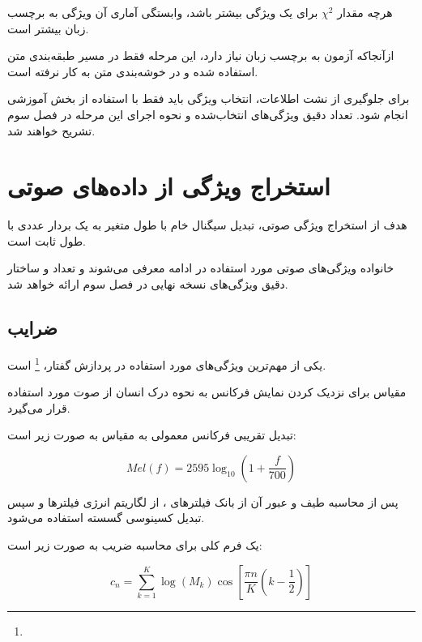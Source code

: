 هرچه مقدار
$\chi^2$
برای یک ویژگی بیشتر باشد، وابستگی آماری آن ویژگی به برچسب زبان بیشتر است.

ازآنجاکه آزمون
به برچسب زبان نیاز دارد، این مرحله فقط در مسیر طبقه‌بندی متن استفاده شده و در خوشه‌بندی متن به کار نرفته است.

برای جلوگیری از نشت اطلاعات، انتخاب ویژگی باید فقط با استفاده از بخش آموزشی انجام شود. تعداد دقیق ویژگی‌های انتخاب‌شده و نحوه اجرای این مرحله در فصل سوم تشریح خواهند شد.

\section{استخراج ویژگی از داده‌های صوتی}

هدف از استخراج ویژگی صوتی، تبدیل سیگنال خام با طول متغیر به یک بردار عددی با طول ثابت است.

خانواده ویژگی‌های صوتی مورد استفاده در ادامه معرفی می‌شوند و تعداد و ساختار دقیق ویژگی‌های نسخه نهایی در فصل سوم ارائه خواهد شد.


\subsection{ضرایب }

یکی از مهم‌ترین ویژگی‌های مورد استفاده در پردازش گفتار،
\footnote{}
است.

مقیاس
برای نزدیک کردن نمایش فرکانس به نحوه درک انسان از صوت مورد استفاده قرار می‌گیرد.

تبدیل تقریبی فرکانس معمولی به مقیاس
به صورت زیر است:

\begin{equation}
Mel(f)
=
2595
\log_{10}
\left(
1+\frac{f}{700}
\right)
\end{equation}

پس از محاسبه طیف و عبور آن از بانک فیلترهای
،
از لگاریتم انرژی فیلترها و سپس تبدیل کسینوسی گسسته استفاده می‌شود.

یک فرم کلی برای محاسبه ضریب
به صورت زیر است:

\begin{equation}
c_n
=
\sum_{k=1}^{K}
\log(M_k)
\cos
\left[
\frac{\pi n}{K}
\left(
k-\frac{1}{2}
\right)
\right]
\end{equation}

